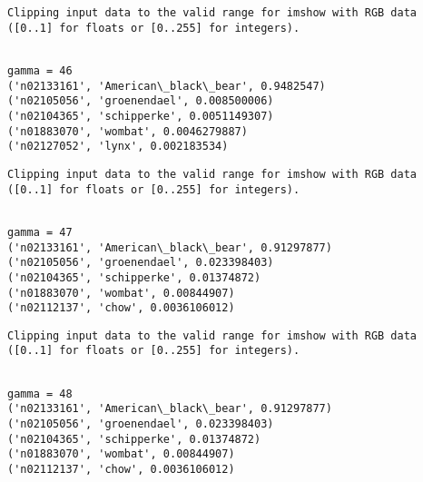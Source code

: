\documentclass[11pt]{article}
\begin{document}
    \begin{Verbatim}[commandchars=\\\{\}]
Clipping input data to the valid range for imshow with RGB data ([0..1] for floats or [0..255] for integers).

    \end{Verbatim}

    \begin{Verbatim}[commandchars=\\\{\}]

gamma = 46
('n02133161', 'American\_black\_bear', 0.9482547)
('n02105056', 'groenendael', 0.008500006)
('n02104365', 'schipperke', 0.0051149307)
('n01883070', 'wombat', 0.0046279887)
('n02127052', 'lynx', 0.002183534)

    \end{Verbatim}

    \begin{Verbatim}[commandchars=\\\{\}]
Clipping input data to the valid range for imshow with RGB data ([0..1] for floats or [0..255] for integers).

    \end{Verbatim}

    \begin{Verbatim}[commandchars=\\\{\}]

gamma = 47
('n02133161', 'American\_black\_bear', 0.91297877)
('n02105056', 'groenendael', 0.023398403)
('n02104365', 'schipperke', 0.01374872)
('n01883070', 'wombat', 0.00844907)
('n02112137', 'chow', 0.0036106012)

    \end{Verbatim}

    \begin{Verbatim}[commandchars=\\\{\}]
Clipping input data to the valid range for imshow with RGB data ([0..1] for floats or [0..255] for integers).

    \end{Verbatim}

    \begin{Verbatim}[commandchars=\\\{\}]

gamma = 48
('n02133161', 'American\_black\_bear', 0.91297877)
('n02105056', 'groenendael', 0.023398403)
('n02104365', 'schipperke', 0.01374872)
('n01883070', 'wombat', 0.00844907)
('n02112137', 'chow', 0.0036106012)

    \end{Verbatim}
\end{document}
